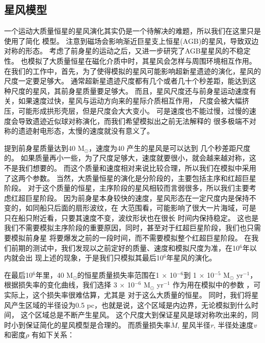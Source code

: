 \subsection{星风模型}
一个运动大质量恒星的星风演化其实仍是一个待解决的难题，所以我们在这里只是使用了简化
模型。
\citet{vanMarle2014}注意到磁场会影响渐近巨星支上恒星(AGB)的星风，导致双边对称的形态。
考虑了前身星的运动之后，\citet{vanMarle2014a}又进一步研究了AGB星星风的不稳定性。
\citet{Meyer2017}也模拟了大质量恒星在磁化介质中时，其星风会怎样与周围环境相互作用。
在我们的工作中，首先，为了使得模拟的星风可能影响超新星遗迹的演化，星风的尺度一定要足够大。
通常超新星遗迹尺度都有几个或者几十个秒差距，能达到这种尺度的星风，其前身星质量要足够大。
而且，星风尺度还与前身星运动速度有关，如果速度过快，星风与运动方向来的星际介质相互作用，
尺度会被大幅挤压，可能形成拱形壳层，但是尺度会大大变小。
可是速度也不能过慢，过慢的速度会导致遗迹近似球对称演化，而我们希望模拟出之前无法解释的
很多极端不对称的遗迹射电形态，太慢的速度就没有意义了。

\citet{Meyer2014}提到前身星质量达到40 M$_{\odot}$，速度为40 \kms 产生的星风是可以达到
几个秒差距尺度的。
如果质量再小一些，为了尺度足够大，速度就要很小，就会越来越对称，这不是我们想要的。
而这个质量和速度相对来说比较合理，所以我们在模拟中采用了这两个参数。
当然，大质量恒星的演化是分阶段的，主要包括主序和红超巨星阶段。
对于这个质量的恒星，主序阶段的星风相较而言弱很多，所以我们主要考虑红超巨星阶段。
因为前身星本身较快的速度，星风形态在一定尺度内是保持不变的，如同船只后面的扇形波纹，在
大范围看，可能影响了很大一片海域，可是只在船只附近看，只要其速度不变，波纹形状也在很长
时间内保持稳定。
这也是我们不需要模拟主序阶段的重要原因，同时，甚至对于红超巨星阶段，我们也只需要模拟前身星
将要爆发之前的一段时间，而不需要模拟整个红超巨星阶段。
在我们前期的测试中，我们发现以之前定好的质量、速度和模拟尺度为准，在10$^{6}$年以内就会出
现上述的现象，于是我们只模拟其最后10$^{6}$年星风的演化。

在最后10$^{6}$年里，40 M$_{\odot}$的恒星质量损失率范围在1 $\times$ 10$^{-6}$到
1 $\times$ 10$^{-5}$ M$_{\odot}$ yr$^{-1}$，根据损失率的变化曲线，我们选择
3 $\times$ 10$^{-6}$ M$_{\odot}$ yr$^{-1}$ 作为用在模拟中的参数
\citep{Meyer2014, vanMarle2012, vanMarle2015}，可实际上，这个损失率很难估算，尤其是
对于这么大质量的恒星\citep{Meyer2014a, Gvaramadze2014}。
同时，我们将星风产生区域的半径设为0.5 pc，也就是说，这个区域是内边界，无论模拟到什么时间，
这个区域总是不断产生星风。
这个尺度大到保证星风是球对称吹出来的，同时小到保证简化的星风模型是合理的。
而质量损失率\textit{$\dot{M}$}, 星风半径\textit{r}, 半径处速度\textit{v}和密度\textit{$\rho$}
有如下关系：

